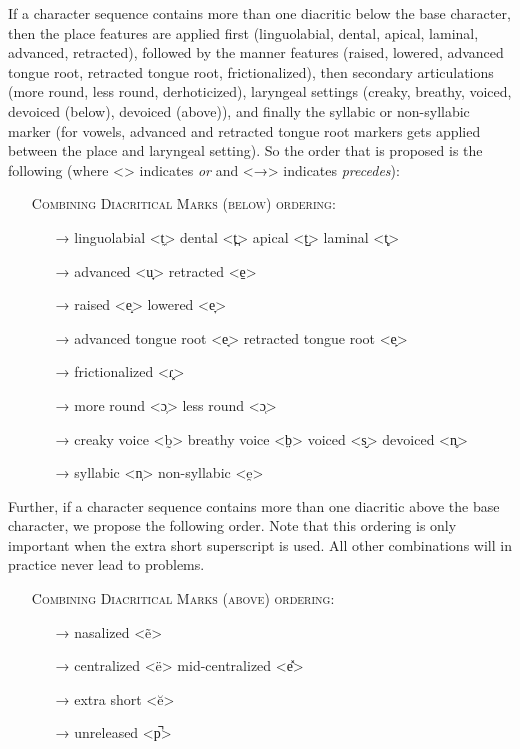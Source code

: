 If a character sequence contains more than one diacritic below the base
character, then the place features are applied first (linguolabial, dental,
apical, laminal, advanced, retracted), followed by the manner features (raised,
lowered, advanced tongue root, retracted tongue root, frictionalized), then
secondary articulations (more round, less round, derhoticized), laryngeal
settings (creaky, breathy, voiced, devoiced (below), devoiced (above)), and
finally the syllabic or non-syllabic marker (for vowels, advanced and retracted
tongue root markers gets applied between the place and laryngeal setting). So
the order that is proposed is the following (where <\textbar{}> indicates
\textit{or} and <→> indicates \textit{precedes}):

\begin{itemize}
	\item[] \textsc{Combining Diacritical Marks (below) ordering:}
	\begin{itemize}	
	  \item[→] linguolabial <t̼> \textbar{} dental <t̪> \textbar{} apical <t̺> \textbar{} laminal <t̻>
	  \item[→] advanced <u̟> \textbar{} retracted <e̠> 
	  \item[→] raised <e̝> \textbar{} lowered <e̞>
	  \item[→] advanced tongue root <e̘> \textbar{} retracted tongue root <e̙>
	  \item[→] frictionalized <ɾ͓>
	  \item[→] more round <ɔ̹> \textbar{} less round <ɔ̜>
	  \item[→] creaky voice <b̰> \textbar{} breathy voice <b̤> \textbar{} voiced <s̬> \textbar{} devoiced <n̥>
	  \item[→] syllabic <n̩> \textbar{} non-syllabic <e̯>
	\end{itemize}
 \end{itemize}

Further, if a character sequence contains more than one diacritic above the base
character, we propose the following order. Note that this ordering is only
important when the extra short superscript is used. All other combinations will 
in practice never lead to problems.

\begin{itemize}
	\item[] \textsc{Combining Diacritical Marks (above) ordering:}
	\begin{itemize}
	  \item[→] nasalized <ẽ>
	  \item[→] centralized <ë> \textbar{} mid-centralized <e̽>
	  \item[→] extra short <ĕ>
	  \item[→] unreleased <p̚>
 \end{itemize} \end{itemize}

